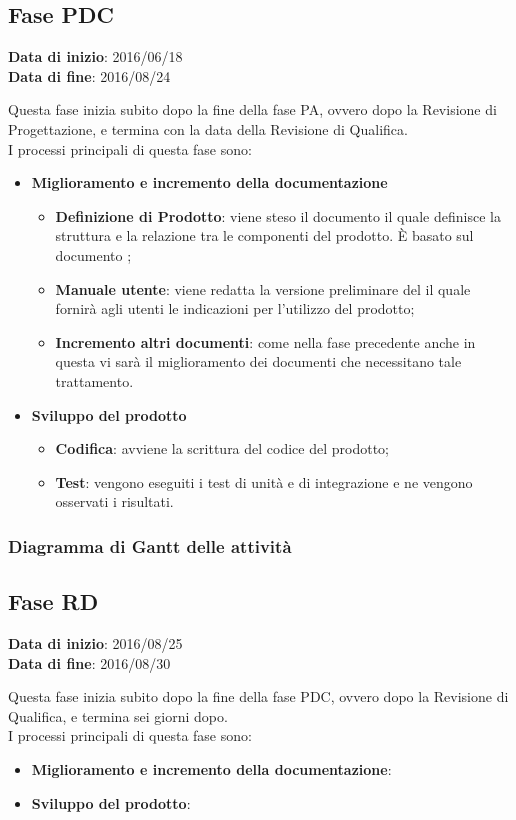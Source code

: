 	\subsection{Fase PDC}
	\begin{center}
		\textbf{Data di inizio}: 2016/06/18 \\
		\textbf{Data di fine}: 2016/08/24 \\
	\end{center}
	Questa fase inizia subito dopo la fine della fase PA, ovvero dopo la Revisione di Progettazione, e termina con la data della Revisione di Qualifica. \\
	I processi principali di questa fase sono: 
		\begin{itemize}
			\item \textbf{Miglioramento e incremento della documentazione}
			\att
			\begin{itemize}
				\item \textbf{Definizione di Prodotto}: viene steso il documento \DPdoc il quale definisce la struttura e la relazione tra le componenti del prodotto. È basato sul documento \STdoc;
				\item \textbf{Manuale utente}: viene redatta la versione preliminare del \MUdoc il quale fornirà agli utenti le indicazioni per l'utilizzo del prodotto;
				\item \textbf{Incremento altri documenti}: come nella fase precedente anche in questa vi sarà il miglioramento dei documenti che necessitano tale trattamento.
			\end{itemize}
			\item \textbf{Sviluppo del prodotto}
			\att
			\begin{itemize}
				\item \textbf{Codifica}: avviene la scrittura del codice del prodotto;
				\item \textbf{Test}: vengono eseguiti i test di unità e di integrazione e ne vengono osservati i risultati. 
			\end{itemize}
		\end{itemize}
		\subsubsection{Diagramma di Gantt delle attività}
		
	\subsection{Fase RD}
	\begin{center}
		\textbf{Data di inizio}: 2016/08/25 \\
		\textbf{Data di fine}: 2016/08/30 \\
	\end{center}
	Questa fase inizia subito dopo la fine della fase PDC, ovvero dopo la Revisione di Qualifica, e termina sei giorni dopo. \\
	I processi principali di questa fase sono: 
		\begin{itemize}
			\item \textbf{Miglioramento e incremento della documentazione}:
			\att
			\item \textbf{Sviluppo del prodotto}:
			\att
		\end{itemize}
